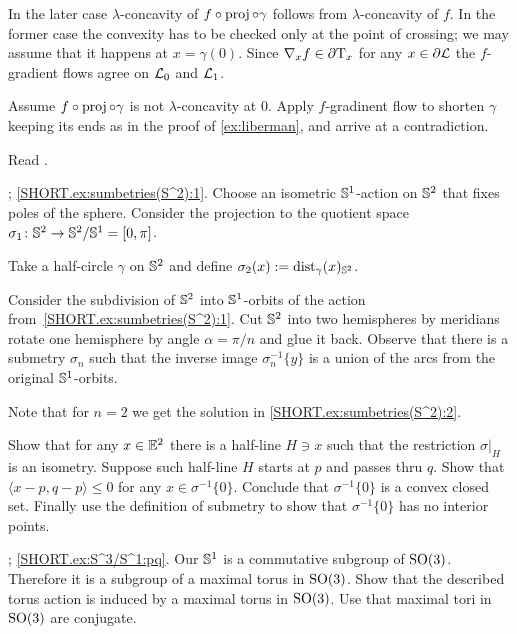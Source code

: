 In the later case $\lambda$-concavity of $f\circ\operatorname{\rm proj}\nolimits\circ\gamma$ follows from $\lambda$-concavity of $f$.
In the former case the convexity has to be checked only at the point of crossing;
we may assume that it happens at $x=\gamma(0)$.
Since $\nabla_xf\in\partial\mathrm{T}_x$ for any $x\in\partial\mathcal{L}$ the $f$-gradient flows agree on $\mathcal{L}_0$ and $\mathcal{L}_1$.

Assume $f\circ\operatorname{\rm proj}\nolimits\circ\gamma$ is not $\lambda$-concavity at $0$.
Apply $f$-gradinent flow to shorten $\gamma$ keeping its ends as in the proof of \ref{ex:liberman},
and arrive at a contradiction.

 Read \cite[Section 4]{terng-thorbergsson}.

\parbf{\ref{ex:sumbetries(S^2)}}; \ref{SHORT.ex:sumbetries(S^2):1}.
Choose an isometric $\mathbb{S}^1$-action on $\mathbb{S}^2$ that fixes poles of the sphere.
Consider the projection to the quotient space $\sigma_1\:\SSS^2\z\to \SSS^2/\SSS^1=[0,\pi]$.

Take a half-circle $\gamma$ on $\mathbb{S}^2$ and define 
$\sigma_2(x)\mathrel{:=}\mathrm{dist}_\gamma(x)_{\mathbb{S}^2}$.

Consider the subdivision of $\mathbb{S}^2$ into $\mathbb{S}^1$-orbits of the action from~\ref{SHORT.ex:sumbetries(S^2):1}.
Cut $\mathbb{S}^2$ into two hemispheres by meridians rotate one hemisphere by angle $\alpha=\pi/n$ and glue it back.
Observe that there is a submetry $\sigma_n$ such that the inverse image $\sigma_n^{-1}\{y\}$ is a union of the arcs from the original $\mathbb{S}^1$-orbits.

Note that for $n=2$ we get the solution in \ref{SHORT.ex:sumbetries(S^2):2}.

Show that for any $x\in\mathbb{E}^2$ there is a half-line $H\ni x$ such that 
the restriction $\sigma|_H$ is an isometry.
Suppose such half-line $H$ starts at $p$ and passes thru $q$.
Show that $\langle x-p,q-p \rangle\le 0$ for any $x\in \sigma^{-1}\{0\}$.
Conclude that $\sigma^{-1}\{0\}$ is a convex closed set.
Finally use the definition of submetry to show that  $\sigma^{-1}\{0\}$ has no interior points. 

\parbf{\ref{ex:S^3/S^1}};
\ref{SHORT.ex:S^3/S^1:pq}.
Our $\mathbb{S}^1$ is a commutative subgroup of $\mathrm{SO}(3)$.
Therefore it is a subgroup of a maximal torus in $\mathrm{SO}(3)$.
Show that the described torus action is induced by a maximal torus in $\mathrm{SO}(3)$.
Use that maximal tori in $\mathrm{SO}(3)$ are conjugate.

